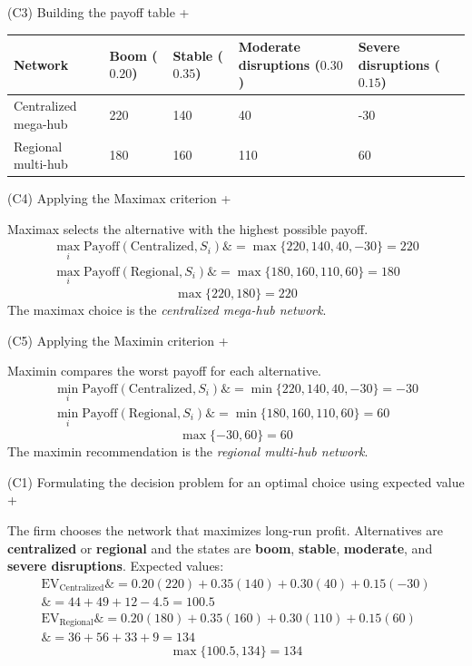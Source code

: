 \documentclass[11pt]{article}
\begin{document}
	
	
	
	
	
	(C3) Building the payoff table
	+
	
	
	\begin{center}
		\begin{tabular}{lllll}
			\toprule
			Network & Boom
			($0.20$) & Stable
			($0.35$) & Moderate disruptions
			($0.30$) & Severe disruptions
			($0.15$) \\
			\midrule
			Centralized mega-hub & 220 & 140 & 40 & -30 \\
			Regional multi-hub & 180 & 160 & 110 & 60 \\
			\bottomrule
		\end{tabular}
	\end{center}
	
	
	
	
	
	
	(C4) Applying the Maximax criterion
	+
	
	
	Maximax selects the alternative with the highest possible payoff.
	\[
	\begin{aligned}
		\max_i \text{Payoff}(\text{Centralized}, S_i) \&= \max\{220, 140, 40, -30\} = 220 \\
		\max_i \text{Payoff}(\text{Regional}, S_i) \&= \max\{180, 160, 110, 60\} = 180
	\end{aligned}
	\]
	\[
	\max\{220, 180\} = 220
	\]
	The maximax choice is the \emph{centralized mega-hub network}.
	
	
	
	
	
	(C5) Applying the Maximin criterion
	+
	
	
	Maximin compares the worst payoff for each alternative.
	\[
	\begin{aligned}
		\min_i \text{Payoff}(\text{Centralized}, S_i) \&= \min\{220, 140, 40, -30\} = -30 \\
		\min_i \text{Payoff}(\text{Regional}, S_i) \&= \min\{180, 160, 110, 60\} = 60
	\end{aligned}
	\]
	\[
	\max\{-30, 60\} = 60
	\]
	The maximin recommendation is the \emph{regional multi-hub network}.
	
	
	
	
	
	(C1) Formulating the decision problem for an optimal choice using expected value
	+
	
	
	The firm chooses the network that maximizes long-run profit. Alternatives are \textbf{centralized} or
	\textbf{regional} and the states are \textbf{boom}, \textbf{stable}, \textbf{moderate},
	and \textbf{severe disruptions}. Expected values:
	\[
	\begin{aligned}
		\mathrm{EV}_{\text{Centralized}} \&= 0.20(220) + 0.35(140) + 0.30(40) + 0.15(-30) \\
		\&= 44 + 49 + 12 - 4.5 = 100.5 \\
		\mathrm{EV}_{\text{Regional}} \&= 0.20(180) + 0.35(160) + 0.30(110) + 0.15(60) \\
		\&= 36 + 56 + 33 + 9 = 134
	\end{aligned}
	\]
	\[
	\max\{100.5, 134\} = 134
	\]
	
\end{document}
